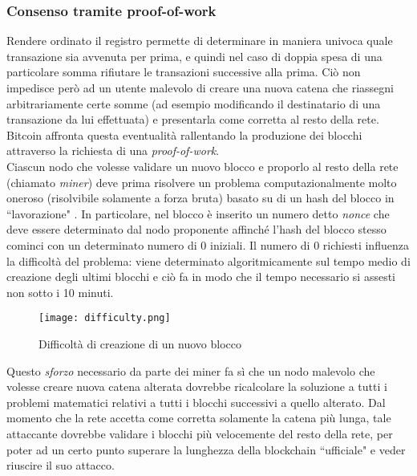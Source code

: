 		\subsubsection{Consenso tramite proof-of-work}
			Rendere ordinato il registro permette di determinare in maniera univoca quale transazione sia avvenuta per prima, e quindi nel caso di doppia spesa di una particolare somma rifiutare le transazioni successive alla prima. Ciò non impedisce però ad un utente malevolo di creare una nuova catena che riassegni arbitrariamente certe somme (ad esempio modificando il destinatario di una transazione da lui effettuata) e presentarla come corretta al resto della rete. Bitcoin affronta questa eventualità rallentando la produzione dei blocchi attraverso la richiesta di una \emph{proof-of-work}. \\
			Ciascun nodo che volesse validare un nuovo blocco e proporlo al resto della rete (chiamato \emph{miner}) deve prima risolvere un problema computazionalmente molto oneroso (risolvibile solamente a forza bruta) basato su di un hash del blocco in ``lavorazione" \cite{hashcash}. In particolare, nel blocco è inserito un numero detto \emph{nonce} che deve essere determinato dal nodo proponente affinché l'hash del blocco stesso cominci con un determinato numero di 0 iniziali. Il numero di 0 richiesti influenza la difficoltà del problema: viene determinato algoritmicamente sul tempo medio di creazione degli ultimi blocchi e ciò fa in modo che il tempo necessario si assesti non sotto i 10 minuti.
			\begin{figure}[ht]
				\centering
				\texttt{[image: difficulty.png]}
				\caption{Difficoltà di creazione di un nuovo blocco}
				\label{fig:bitcoin_difficulty}
			\end{figure}
			Questo \emph{sforzo} necessario da parte dei miner fa sì che un nodo malevolo che volesse creare nuova catena alterata dovrebbe ricalcolare la soluzione a tutti i problemi matematici relativi a tutti i blocchi successivi a quello alterato. Dal momento che la rete accetta come corretta solamente la catena più lunga, tale attaccante dovrebbe validare i blocchi più velocemente del resto della rete, per poter ad un certo punto superare la lunghezza della blockchain ``ufficiale" e veder riuscire il suo attacco.
